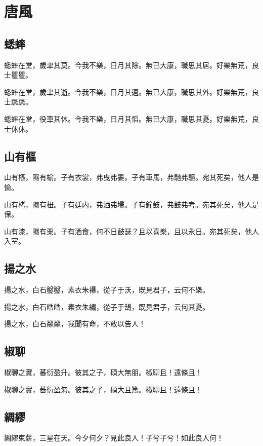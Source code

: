\section[唐風]{唐風}

\subsection[蟋蟀]{蟋蟀}

蟋蟀在堂，歲聿其莫。今我不樂，日月其除。無已大康，職思其居。好樂無荒，良士瞿瞿。

蟋蟀在堂，歲聿其逝。今我不樂，日月其邁。無已大康，職思其外。好樂無荒，良士蹶蹶。

蟋蟀在堂，役車其休。今我不樂，日月其慆。無已大康，職思其憂。好樂無荒，良士休休。

\subsection[山有樞]{山有樞}

山有樞，隰有榆。子有衣裳，弗曳弗婁。子有車馬，弗馳弗驅。宛其死矣，他人是愉。

山有栲，隰有杻。子有廷内，弗洒弗埽。子有鐘鼓，弗鼓弗考。宛其死矣，他人是保。

山有漆，隰有栗。子有酒食，何不日鼓瑟？且以喜樂，且以永日。宛其死矣，他人入室。

\subsection[揚之水]{揚之水}

揚之水，白石鑿鑿，素衣朱襮，從子于沃，既見君子，云何不樂。

揚之水，白石皓皓，素衣朱繡，從子于鵠，既見君子，云何其憂。

揚之水，白石粼粼，我聞有命，不敢以告人！

\subsection[椒聊]{椒聊}

椒聊之實，蕃衍盈升。彼其之子，碩大無朋。椒聊且！遠條且！

椒聊之實，蕃衍盈匊。彼其之子，碩大且篤。椒聊且！遠條且！

\subsection[綢繆]{綢繆}

綢繆束薪，三星在天。今夕何夕？見此良人！子兮子兮！如此良人何！

